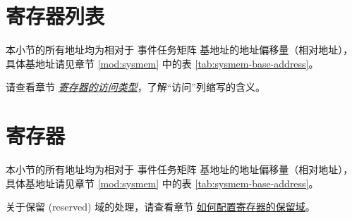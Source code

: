 \documentclass[main\_\_CN.tex]{subfiles}
\begin{document}



\newpage
\hypertarget{evntaskmatrix-reg-summ}{}
\section{寄存器列表}
\label{sec:evntaskmatrix-reg-summ}

本小节的所有地址均为相对于 事件任务矩阵 基地址的地址偏移量（相对地址），具体基地址请见章节 \ref{mod:sysmem} \textit{} 中的表 \ref{tab:sysmem-base-address}。

请查看章节 \hyperref[glossary-access-types]{\textit{寄存器的访问类型}}，了解“访问”列缩写的含义。






\newpage
\section{寄存器}

本小节的所有地址均为相对于 事件任务矩阵 基地址的地址偏移量（相对地址），具体基地址请见章节 \ref{mod:sysmem} \textit{} 中的表 \ref{tab:sysmem-base-address}。

关于保留 (reserved) 域的处理，请查看章节 \hyperref[programming-reserved-field]{如何配置寄存器的保留域}。


\end{document}
